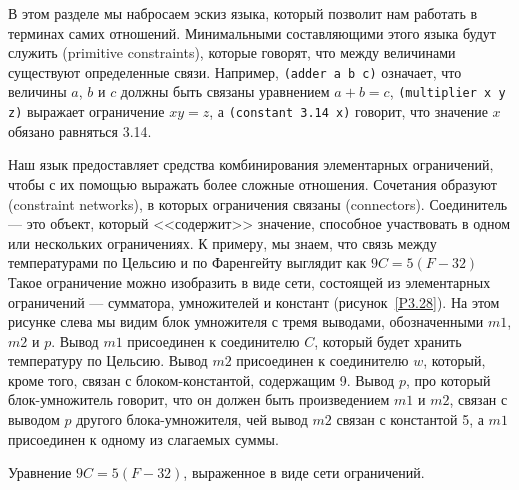 В этом
разделе мы набросаем эскиз языка, который позволит
нам работать в терминах самих отношений.  Минимальными составляющими
этого языка будут служить 
 (primitive constraints), которые говорят, что между величинами существуют
определенные связи.  Например, {\tt (adder a b c)} означает,
что величины $a$, $b$ и $c$ должны
быть связаны уравнением $a + b = c$,
{\tt (multiplier x y z)} выражает ограничение $xy =
z$, а {\tt (constant 3.14 x)} говорит, что значение
$x$ обязано равняться 3.14.

Наш язык предоставляет средства комбинирования элементарных
ограничений, чтобы с их помощью выражать более сложные
отношения.  Сочетания образуют
 (constraint networks), в которых
ограничения связаны  (connectors).
Соединитель --- это объект, который <<содержит>> значение, способное
участвовать в одном или нескольких ограничениях.  К примеру, мы знаем, что
связь между температурами по Цельсию и по Фаренгейту выглядит как
$9 C = 5 (F - 32)$
Такое ограничение можно изобразить в виде сети, состоящей из
элементарных ограничений --- сумматора, умножителей и констант
(рисунок~\ref{P3.28}).  На этом рисунке слева мы видим
блок умножителя с тремя выводами, обозначенными $m1$,
$m2$ и $p$.  Вывод $m1$ присоединен
к соединителю $C$, который будет хранить температуру по
Цельсию. Вывод $m2$ присоединен к соединителю
$w$, который, кроме того, связан с блоком-константой,
содержащим 9.  Вывод $p$, про который блок-умножитель
говорит, что он должен быть произведением $m1$ и
$m2$, связан с выводом $p$ другого
блока-умножителя, чей вывод $m2$ связан с константой 5, а
$m1$ присоединен к одному из слагаемых суммы.


\begin{cntrfig}

\caption{Уравнение $9C = 5(F - 32)$,
выраженное в виде сети ограничений.}
\label{P3.28}

\end{cntrfig}

